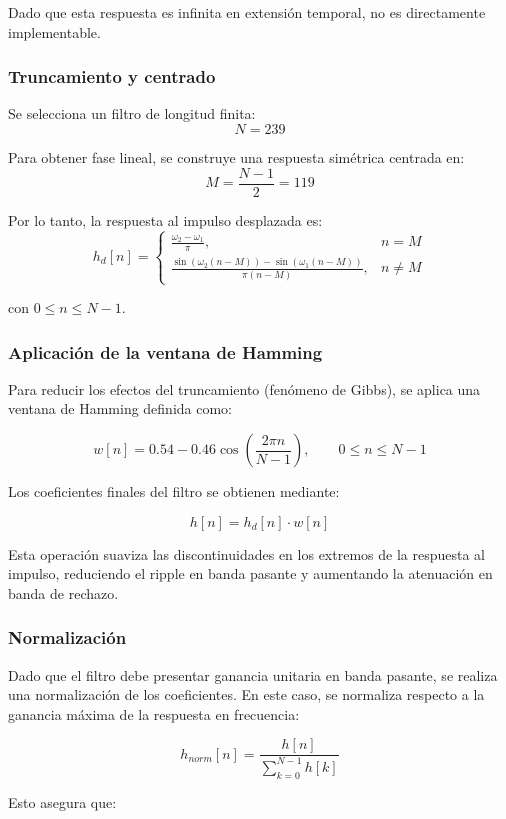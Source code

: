 \documentclass[a4,11pt]{article}
\begin{document}
Dado que esta respuesta es infinita en extensión temporal, no es directamente implementable.

\subsubsection{Truncamiento y centrado}

Se selecciona un filtro de longitud finita:
\[
N = 239
\]

Para obtener fase lineal, se construye una respuesta simétrica centrada en:
\[
M = \frac{N-1}{2} = 119
\]

Por lo tanto, la respuesta al impulso desplazada es:
\[
h_d[n] =
\begin{cases}
\frac{\omega_2 - \omega_1}{\pi}, & n = M \\
\frac{\sin\left(\omega_2 (n-M)\right) - \sin\left(\omega_1 (n-M)\right)}{\pi (n-M)}, & n \neq M
\end{cases}
\]

con \( 0 \le n \le N-1 \).

\subsubsection{Aplicación de la ventana de Hamming}

Para reducir los efectos del truncamiento (fenómeno de Gibbs), se aplica una ventana de Hamming definida como:

\[
w[n] = 0.54 - 0.46 \cos\left(\frac{2\pi n}{N-1}\right), \qquad 0 \le n \le N-1
\]

Los coeficientes finales del filtro se obtienen mediante:

\[
h[n] = h_d[n] \cdot w[n]
\]

Esta operación suaviza las discontinuidades en los extremos de la respuesta al impulso, reduciendo el ripple en banda pasante y aumentando la atenuación en banda de rechazo.

\subsubsection{Normalización}

Dado que el filtro debe presentar ganancia unitaria en banda pasante, se realiza una normalización de los coeficientes. En este caso, se normaliza respecto a la ganancia máxima de la respuesta en frecuencia:

\[
h_{norm}[n] = \frac{h[n]}{\sum_{k=0}^{N-1} h[k]}
\]

Esto asegura que:
\end{document}
